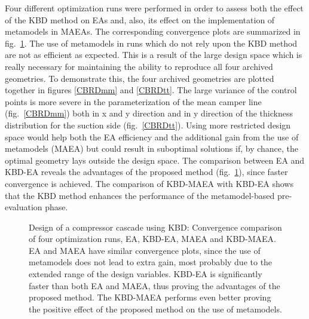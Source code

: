 Four different optimization runs were performed in order to assess both the effect of the KBD method on EAs and, also, its effect on the implementation of metamodels in MAEAs. The corresponding convergence plots are summarized in fig.\ \ref{CBRDrela}. The use of metamodels in runs which do not rely upon the KBD method are not as efficient as expected. This is a result of the large design space which is really necessary for maintaining the ability to reproduce all four archived geometries. To demonstrate this, the four archived geometries are plotted together in figures \ref{CBRDmm} and \ref{CBRDtt}. The large variance of the control points is more severe in the parameterization of the mean camper line (fig.\ \ref{CBRDmm}) both in x and y direction and in y direction of the thickness distribution for the suction side (fig.\ \ref{CBRDtt}). Using more restricted design space would help both the EA efficiency and the additional gain from the use of metamodels (MAEA) but could result in suboptimal solutions if, by chance, the optimal geometry lays outside the design space. The comparison between EA and KBD-EA reveals the advantages of the proposed method (fig.\ \ref{CBRDrela}), since faster convergence is achieved. The comparison of KBD-MAEA with KBD-EA shows that the KBD method enhances the performance of the metamodel-based pre-evaluation phase. 

\begin{figure}[h!]
\begin{minipage}[b]{1\linewidth}
 \centering
\end{minipage}
\caption{Design of a compressor cascade using KBD: Convergence comparison of four optimization runs, EA, KBD-EA, MAEA and KBD-MAEA. EA and MAEA have similar convergence plots, since the use of metamodels does not lead to extra gain, most probably due to the extended range of the design variables. KBD-EA is significantly faster than  both EA and MAEA, thus proving the advantages of the proposed method. The KBD-MAEA performs even better proving the positive effect of the proposed method on the use of metamodels.} 
\label{CBRDrela}
\end{figure}

